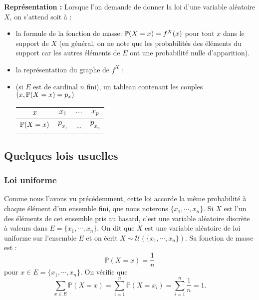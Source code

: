 {\bf\sffamily Représentation :} Lorsque l'on demande de donner la loi d'une variable aléatoire $X$, on s'attend soit à :
\begin{itemize}\item la formule de la fonction de masse: $\P(X=x) = f^X(x)$ pour tout $x$ dans le support de $X$ (en général, on ne note que les probabilités des éléments du support car les autres éléments de $E$ ont une probabilité nulle d'apparition).
		\item la représentation du graphe de $f^X$ :
			\begin{center}
			
	\end{center}
\item  (si $E$ est de cardinal $n$ fini), un tableau contenant les couples $(x,\P(X=x) = p_{x})$
	\begin{center}
	\begin{tabular}[]{|c|ccc|}
		\hline $x$ & $x_1$ & $\cdots$ & $x_p$ \\\hline
		$\P(X = x)$ & $p_{x_1}$ & \ldots & $p_{x_n}$ \\ \hline
	\end{tabular}
	\end{center}
	\end{itemize}

\sld{\vfill\pagebreak[5]}%

\subsection{Quelques lois usuelles}

\subsubsection{Loi uniforme}

Comme nous l'avons vu précédemment, cette loi accorde la même probabilité à chaque élément d'un ensemble fini, que nous noterons $\{x_1,\cdots,x_n\}$. Si $X$ est l'un des éléments de cet ensemble pris au hasard, c'est une variable aléatoire discrète à valeurs dans $E = \{x_1,\cdots, x_n\}$. On dit que $X$ est une variable aléatoire de loi uniforme sur l'ensemble $E$ et on écrit $X \sim \mathcal{U}(\{x_1,\cdots,x_n\})$. Sa fonction de masse est : 
$$ \mathbb{P}(X=x) = \frac{1}{n} $$
pour $x \in  E = \{x_1,\cdots,x_n\}$. On vérifie que 
\[ \sum_{x \in E} \mathbb{P}(X=x) =  \sum_{i=1}^n \mathbb{P}(X=x_i) = \sum_{i=1}^n \frac{1}{n} =1.\]
\begin{center}
	
\end{center}


